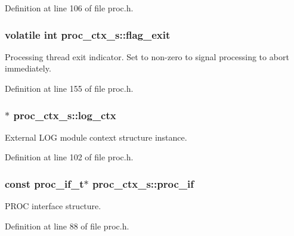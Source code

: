 Definition at line 106 of file proc.\+h.

\subsubsection[{\texorpdfstring{flag\+\_\+exit}{flag_exit}}]{\setlength{\rightskip}{0pt plus 5cm}volatile int proc\+\_\+ctx\+\_\+s\+::flag\+\_\+exit}\hypertarget{structproc__ctx__s_a86a21b28f6c41f7a9a4cc9586f782d68}{}\label{structproc__ctx__s_a86a21b28f6c41f7a9a4cc9586f782d68}
Processing thread exit indicator. Set to non-\/zero to signal processing to abort immediately. 

Definition at line 155 of file proc.\+h.

\subsubsection[{\texorpdfstring{log\+\_\+ctx}{log_ctx}}]{$\ast$ proc\+\_\+ctx\+\_\+s\+::log\+\_\+ctx}\hypertarget{structproc__ctx__s_a7c58dee78b4d7834e4c2fe430cd267d5}{}\label{structproc__ctx__s_a7c58dee78b4d7834e4c2fe430cd267d5}
External L\+OG module context structure instance. 

Definition at line 102 of file proc.\+h.

\subsubsection[{\texorpdfstring{proc\+\_\+if}{proc_if}}]{\setlength{\rightskip}{0pt plus 5cm}const {\bf proc\+\_\+if\+\_\+t}$\ast$ proc\+\_\+ctx\+\_\+s\+::proc\+\_\+if}\hypertarget{structproc__ctx__s_ae63f720fef21f807ed42fe76806140f6}{}\label{structproc__ctx__s_ae63f720fef21f807ed42fe76806140f6}
P\+R\+OC interface structure. 

Definition at line 88 of file proc.\+h.

